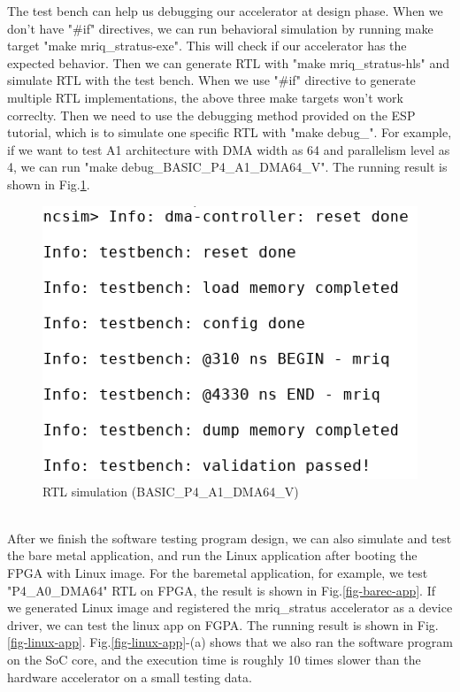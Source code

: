 \documentclass{sig-alternate}
\begin{document}
The test bench can help us debugging our accelerator at design phase. When we don't have "\#if" directives, we can run behavioral simulation by running make target "make mriq\_stratus-exe". This will check if our accelerator has the expected behavior. Then we can generate RTL with "make mriq\_stratus-hls" and simulate RTL with the test bench. When we use "\#if" directive to generate multiple RTL implementations, the above three make targets won't work correclty. Then we need to use the debugging method provided on the ESP tutorial, which is to simulate one specific RTL with "make debug\_<RTL name>". For example, if we want to test A1 architecture with DMA width as 64 and parallelism level as 4, we can run "make debug\_BASIC\_P4\_A1\_DMA64\_V". The running result is shown in Fig.\ref{fig-3}. 
\\
\begin{figure}[ht]
\centering
\captionsetup{justification=centering, format=hang}
\includegraphics[width=0.75\columnwidth]{figure/reverted-debug-sim-A1-4-4-2-2.png}
\caption{RTL simulation (BASIC\_P4\_A1\_DMA64\_V)}
\label{fig-3}
\end{figure}
\\
After we finish the software testing program design, we can also simulate and test the bare metal application, and run the Linux application after booting the FPGA with Linux image. For the baremetal application, for example, we test "P4\_A0\_DMA64" RTL on FPGA, the result is shown in Fig.\ref{fig-barec-app}. If we generated Linux image and registered the mriq\_stratus accelerator as a device driver, we can test the linux app on FGPA. The running result is shown in Fig.\ref{fig-linux-app}. Fig.\ref{fig-linux-app}-(a) shows that we also ran the software program on the SoC core, and the execution time is roughly 10 times slower than the hardware accelerator on a small testing data.
\end{document}
